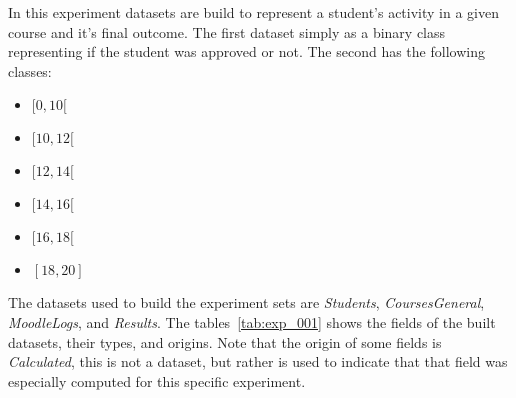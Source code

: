 
In this experiment datasets are build to represent a student's activity in a
given course and it's final outcome. The first dataset simply as a binary class
representing if the student was approved or not. The second has the following
classes:

\begin{itemize}
    \item $ [0, 10[ $
    \item $ [10, 12[ $
    \item $ [12, 14[ $
    \item $ [14, 16[ $
    \item $ [16, 18[ $
    \item $ [18, 20] $
\end{itemize}

The datasets used to build the experiment sets are \textit{Students},
\textit{CoursesGeneral}, \textit{MoodleLogs}, and \textit{Results}. The
tables~\ref{tab:exp_001} shows the fields of the built datasets, their types,
and origins. Note that the origin of some fields is \textit{Calculated}, this
is not a dataset, but rather is used to indicate that that field was especially
computed for this specific experiment.

